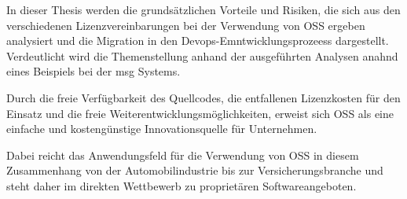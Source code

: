 In dieser Thesis werden die grundsätzlichen Vorteile und Risiken, die sich aus den verschiedenen Lizenzvereinbarungen bei der Verwendung von OSS ergeben analysiert und die Migration in den Devops-Emntwicklungsprozeess dargestellt. Verdeutlicht wird die Themenstellung anhand der ausgeführten Analysen anahnd eines Beispiels bei der msg Systems. 




Durch die freie Verfügbarkeit des Quellcodes, die entfallenen Lizenzkosten für den Einsatz und die freie Weiterentwicklungsmöglichkeiten, erweist sich OSS als eine einfache und kostengünstige Innovationsquelle für Unternehmen. 

Dabei reicht das Anwendungsfeld für die Verwendung von OSS in diesem Zusammenhang von der Automobilindustrie bis zur Versicherungsbranche und steht daher im direkten Wettbewerb zu proprietären Softwareangeboten. 